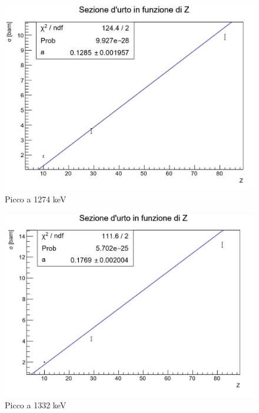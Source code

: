 \documentclass[a4paper,10pt]{article}
\begin{document}
\begin{figure}[H]
    \centering
    \includegraphics[scale=0.6]{grafici/picco1274}
    \caption{Picco a 1274 keV}
\end{figure}

\begin{figure}[H]
    \centering
    \includegraphics[scale=0.6]{grafici/picco1332}
    \caption{Picco a 1332 keV}
\end{figure}
\end{document}
